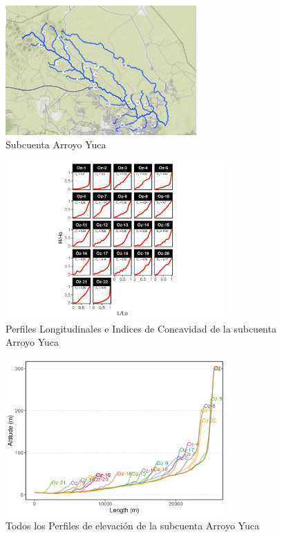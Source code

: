 \documentclass[11pt,]{article}
\begin{document}
\begin{figure}
\centering
\includegraphics[width=0.65000\textwidth]{Productos Generados/p_yuca.png}
\caption{\label{fig:LFP_Yuca0} Subcuenta Arroyo Yuca}
\end{figure}

\begin{figure}
\centering
\includegraphics[width=0.75000\textwidth]{Productos Generados/p_c_yuca1.png}
\caption{\label{fig:LFP_Yuca1} Perfiles Longitudinales e Indices de
Concavidad de la subcuenta Arroyo Yuca}
\end{figure}

\begin{figure}
\centering
\includegraphics[width=0.75000\textwidth]{Productos Generados/p_c_yuca.png}
\caption{\label{fig:LFP_Yuca2} Todos los Perfiles de elevación de la
subcuenta Arroyo Yuca}
\end{figure}
\end{document}
